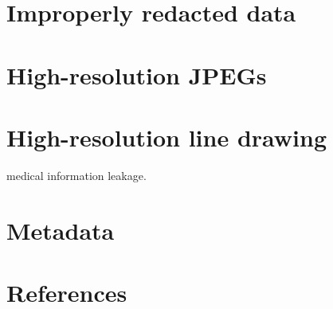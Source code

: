 \section{Improperly redacted data}
\section{High-resolution JPEGs}
\section{High-resolution line drawing}
medical information leakage.
\section{Metadata}
\section{References}



